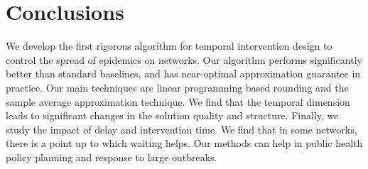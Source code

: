 \section{Conclusions}
\label{sec:conc}

We develop the first rigorous algorithm for temporal intervention design to control the spread of epidemics on networks. Our algorithm performs significantly better than standard baselines, and has near-optimal approximation guarantee in practice. Our main techniques are linear programming based rounding and the sample average approximation technique.
We find that the temporal dimension leads to significant changes in the solution quality and structure. Finally, we study the impact of delay and intervention time. We find that in some networks, there is a point up to which waiting helps. Our methods can help in public health policy planning and response to large outbreaks. 
